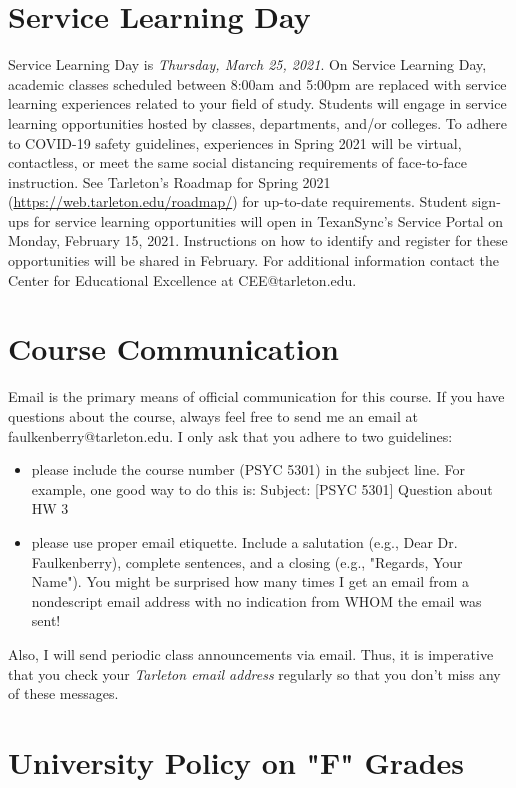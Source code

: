 \documentclass[10pt]{article}
\begin{document}
\section*{Service Learning Day}
\label{sec:org7236e02}
Service Learning Day is \emph{Thursday, March 25, 2021}.  On Service Learning Day, academic classes scheduled between 8:00am and 5:00pm are replaced with service learning experiences related to your field of study. Students will engage in service learning opportunities hosted by classes, departments, and/or colleges. To adhere to COVID-19 safety guidelines, experiences in Spring 2021 will be virtual, contactless, or meet the same social distancing requirements of face-to-face instruction. See Tarleton's Roadmap for Spring 2021 (\url{https://web.tarleton.edu/roadmap/}) for up-to-date requirements. Student sign-ups for service learning opportunities will open in TexanSync’s Service Portal on Monday, February 15, 2021. Instructions on how to identify and register for these opportunities will be shared in February. For additional information contact the Center for Educational Excellence at CEE@tarleton.edu.
\section*{Course Communication}
\label{sec:org975efe6}

Email is the primary means of official communication for this course.  If you have questions about the course, always feel free to send me an email at faulkenberry@tarleton.edu.  I only ask that you adhere to two guidelines:
\begin{itemize}
\item please include the course number (PSYC 5301) in the subject line.  For example, one good way to do this is:  Subject: [PSYC 5301] Question about HW 3
\item please use proper email etiquette.  Include a salutation (e.g., Dear Dr. Faulkenberry), complete sentences, and a closing (e.g., "Regards, Your Name").  You might be surprised how many times I get an email from a nondescript email address with no indication from WHOM the email was sent!
\end{itemize}

Also, I will send periodic class announcements via email.  Thus, it is imperative that you check your \emph{Tarleton email address} regularly so that you don't miss any of these messages.

\section*{University Policy on "F" Grades}
\label{sec:org5642ca6}
\end{document}
